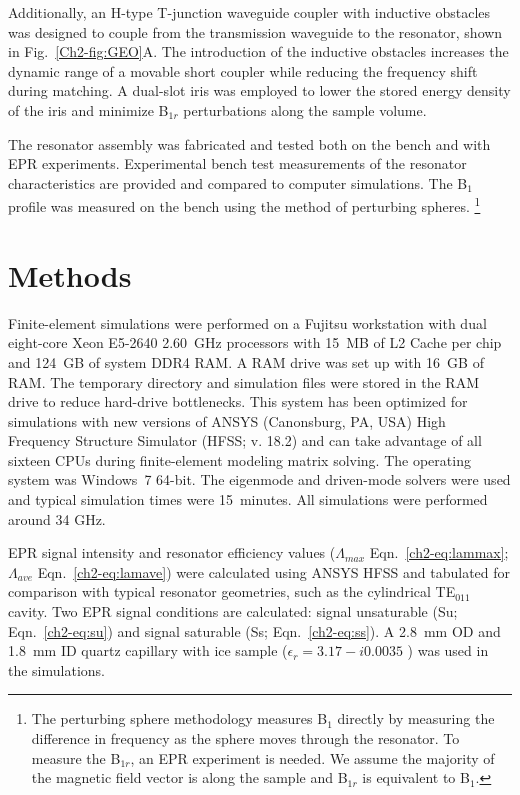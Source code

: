 Additionally, an H-type T-junction waveguide coupler with inductive obstacles was designed to couple from the transmission waveguide to the resonator, shown in Fig.~\ref{Ch2-fig:GEO}A. The introduction of the inductive obstacles increases the dynamic range of a movable short coupler while reducing the frequency shift during matching. A dual-slot iris was employed to lower the stored energy density of the iris and minimize B$_{1r}$ perturbations along the sample volume. \cite{UFLGR2017}

The resonator assembly was fabricated and tested both on the bench and with EPR experiments. Experimental bench test measurements of the resonator characteristics are provided and compared to computer simulations. The B$_{1}$ profile was measured on the bench using the method of perturbing spheres. \footnote{The perturbing sphere methodology measures B$_{1}$ directly by measuring the difference in frequency as the sphere moves through the resonator. To measure the B$_{1r}$, an EPR experiment is needed. We assume the majority of the magnetic field vector is along the sample and B$_{1r}$ is equivalent to B$_{1}$.} 

\section{Methods}
Finite-element simulations were performed on a Fujitsu workstation with dual eight-core Xeon E5-2640 2.60~GHz processors with 15~MB of L2 Cache per chip and 124~GB of system DDR4 RAM. A RAM drive was set up with 16~GB of RAM. The temporary directory and simulation files were stored in the RAM drive to reduce hard-drive bottlenecks. This system has been optimized for simulations with new versions of ANSYS (Canonsburg, PA, USA) High Frequency Structure Simulator (HFSS; v. 18.2) and can take advantage of all sixteen CPUs during finite-element modeling matrix solving. The operating system was Windows~7 64-bit. The eigenmode and driven-mode solvers were used and typical simulation times were 15~minutes. All simulations were performed around 34 GHz.

EPR signal intensity and resonator efficiency values ($\Lambda_{max}$ Eqn.~\ref{ch2-eq:lammax}; $\Lambda_{ave}$ Eqn.~\ref{ch2-eq:lamave}) were calculated using ANSYS HFSS \cite{misrabook} and tabulated for comparison with typical resonator geometries, such as the cylindrical TE$_{011}$ cavity. \cite{generalte011} Two EPR signal conditions are calculated: signal unsaturable (Su; Eqn.~\ref{ch2-eq:su}) and signal saturable (Ss; Eqn.~\ref{ch2-eq:ss}). A 2.8~mm OD and 1.8~mm ID quartz capillary with ice sample ($\epsilon_r=3.17-i0.0035$ \cite{icedielectric} ) was used in the simulations.

